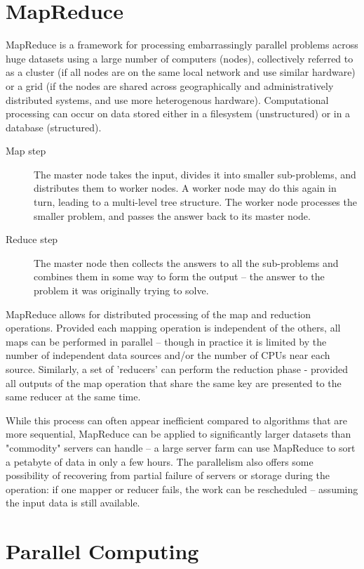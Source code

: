 \documentclass[12pt]{article} %
\begin{document}
\section{MapReduce}
MapReduce is a framework for processing embarrassingly parallel problems across huge datasets using a large number of computers (nodes), collectively referred to as a cluster (if all nodes are on the same local network and use similar hardware) or a grid (if the nodes are shared across geographically and administratively distributed systems, and use more heterogenous hardware). Computational processing can occur on data stored either in a filesystem (unstructured) or in a database (structured).

\begin{description} \item[Map step] The master node takes the input, divides it into smaller sub-problems, and distributes them to worker nodes. A worker node may do this again in turn, leading to a multi-level tree structure. The worker node processes the smaller problem, and passes the answer back to its master node.
\item[Reduce step] The master node then collects the answers to all the sub-problems and combines them in some way to form the output – the answer to the problem it was originally trying to solve.
\end{description}

MapReduce allows for distributed processing of the map and reduction operations. Provided each mapping operation is independent of the others, all maps can be performed in parallel – though in practice it is limited by the number of independent data sources and/or the number of CPUs near each source. Similarly, a set of 'reducers' can perform the reduction phase - provided all outputs of the map operation that share the same key are presented to the same reducer at the same time. 

While this process can often appear inefficient compared to algorithms that are more sequential, MapReduce can be applied to significantly larger datasets than "commodity" servers can handle – a large server farm can use MapReduce to sort a petabyte of data in only a few hours. The parallelism also offers some possibility of recovering from partial failure of servers or storage during the operation: if one mapper or reducer fails, the work can be rescheduled – assuming the input data is still available.
\section{Parallel Computing}
\end{document}
